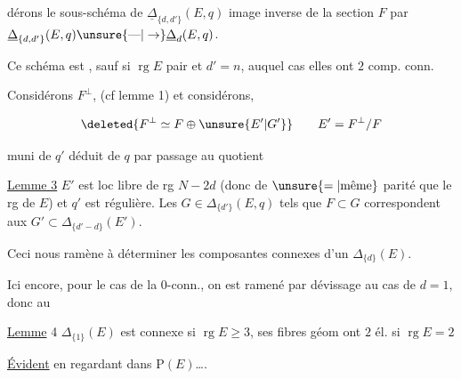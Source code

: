 %
dérons le sous-schéma de $\underline\Delta_{\{d,d'\}}(E,q)$  image inverse de la section $F$ par $\underline\Delta_{\{d,d'\}}(E,q)\unsure{\text{---}|\to}\underline\Delta_d(E,q)$.

Ce schéma est  ,  sauf si $\operatorname{rg}E$ pair et $d'=n$, auquel cas elles ont $2$ comp. conn.


Considérons $F^\perp$, (cf lemme 1) et considérons, 

\[
 \deleted{F^\perp\simeq F\oplus\unsure{E'|G'}}\qquad E'=F^\perp/F
\]

muni de $q'$ déduit de $q$ par passage au quotient

 \uline{Lemme 3}   $E'$ est loc libre  de rg $N-2d$ (donc de $\unsure{=|\text{même}}$ parité que le rg de $E$) et $q'$ est régulière. Les $G\in\Delta_{\{d'\}}(E,q)$ tels que $F\subset G$ correspondent  aux $G'\subset\Delta_{\{d'-d\}}(E')$.

Ceci nous ramène à déterminer les composantes connexes d'un $\Delta_{\{d\}}(E)$.

Ici encore, pour le cas de la $0$-conn., on est ramené par dévissage au cas de $d=1$, donc  au 

\uline{Lemme} 4 $\Delta_{\{1\}}(E)$ est  connexe si $\operatorname{rg} E\geq3$, ses fibres géom ont $2$ él. si $\operatorname{rg} E=2$

\uline{Évident}  en regardant dans $\mathrm P(E)$\ldots.

